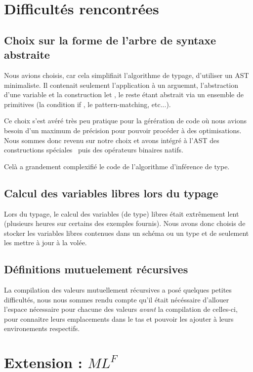 \documentclass[a4paper]{article}
\def\mlf{$ML^F$}
\begin{document}
\section{Difficultés rencontrées}

\subsection{Choix sur la forme de l'arbre de syntaxe abstraite}
Nous avions choisis, car cela simplifiait l'algorithme de typage,
d'utiliser un AST minimaliste. Il contenait seulement l'application à
un arguemnt, l'abstraction d'une variable et la construction \og let
\fg, le reste étant abstrait via un ensemble de primitives (la
condition \og if \fg, le pattern-matching, etc...).

Ce choix s'est avéré très peu pratique pour la gérération de code où
nous avions besoin d'un maximum de précision pour pouvoir procéder à
des optimisations. Nous sommes donc revenu sur notre choix et avons
intégré à l'AST des \og constructions spéciales \fg~puis des opérateurs
binaires natifs.

Celà a grandement complexifié le code de l'algorithme d'inférence de type.

\subsection{Calcul des variables libres lors du typage}

Lors du typage, le calcul des variables (de type) libres était
extrêmement lent (plusieurs heures sur certains des exemples fournis).
Nous avons donc choisis de stocker les variables libres contenues dans
un schéma ou un type et de seulement les mettre à jour à la volée.


\subsection{Définitions mutuelement récursives}

La compilation des valeurs mutuellement récursives a posé quelques
petites difficultés, nous nous sommes rendu compte qu'il était
nécéssaire d'allouer l'espace nécessaire pour chacune des valeurs
\emph{avant} la compilation de celles-ci, pour connaitre leurs
emplacements dans le tas et pouvoir les ajouter à leurs environements
respectifs.

\section{Extension : \mlf}\label{mlf}
\end{document}
